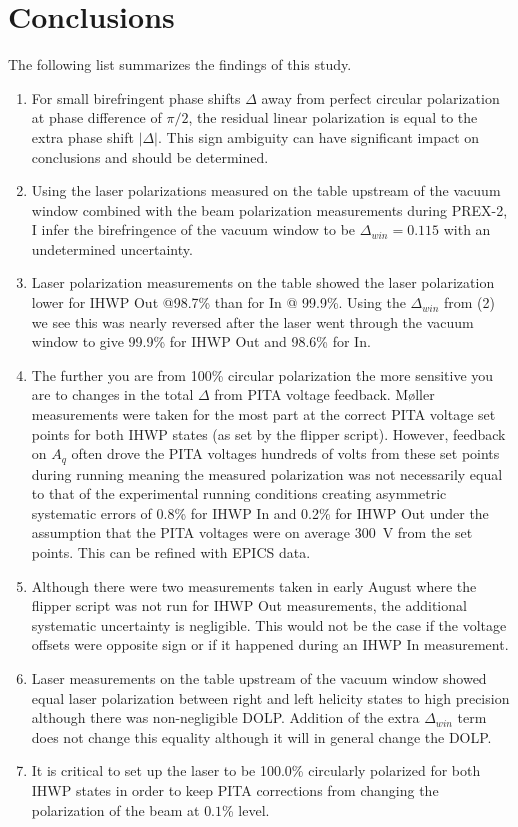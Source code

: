 \documentclass[12pt]{article}
\begin{document}
\section{Conclusions}
The following list summarizes the findings of this study.
\begin{enumerate}
\item{For small birefringent phase shifts $\Delta$ away from perfect circular polarization at phase difference of $\pi/2$, the residual linear polarization is equal to the extra phase shift $\left|\Delta\right|$. This sign ambiguity can have significant impact on conclusions and should  be determined. }
\item{Using the laser polarizations measured on the table upstream of the vacuum window combined with the beam polarization measurements during PREX-2, I infer the birefringence of the vacuum window to be $\Delta_{win}=0.115$ with an undetermined uncertainty.}
\item{Laser polarization measurements on the table showed the laser polarization lower for IHWP Out @98.7\% than for In @ 99.9\%. Using the $\Delta_{win}$ from (2) we see this was nearly reversed after the laser went through the vacuum window to give 99.9\% for IHWP Out and 98.6\% for In.}
\item{The further you are from 100\% circular polarization the more sensitive you are to changes in the total $\Delta$ from PITA voltage feedback. M\o ller measurements were taken for the most part at the correct PITA voltage set points for both IHWP states (as set by the flipper script). However, feedback on $A_q$ often drove the PITA voltages hundreds of volts from these set points during running meaning the measured polarization was not necessarily equal to that of the experimental running conditions creating asymmetric systematic errors of 0.8\% for IHWP In and 0.2\% for IHWP Out under the assumption that the PITA voltages were on average 300~V from the set points. This can be refined with EPICS data.}
\item{Although there were two measurements taken in early August where the flipper script was not run for IHWP Out measurements, the additional systematic uncertainty is negligible. This would not be the case if the voltage offsets were opposite sign or if it happened during an IHWP In measurement.}
\item{Laser measurements on the table upstream of the vacuum window showed equal laser polarization between right and left helicity states to high precision although there was non-negligible DOLP.  Addition of the extra $\Delta_{win}$ term does not change this equality although it will in general change the DOLP.}
\item{It is critical to set up the laser to be 100.0\% circularly polarized for both IHWP states in order to keep PITA corrections from changing the polarization of the beam at $0.1$\% level.}
\end{enumerate}



%


\end{document}
